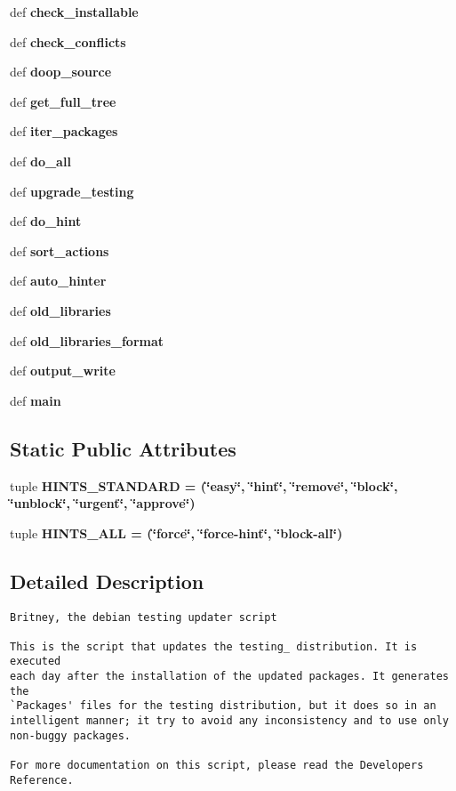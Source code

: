\begin{CompactItemize}
\item 
def \bf{check\_\-installable}
\item 
def \bf{check\_\-conflicts}
\item 
def \bf{doop\_\-source}
\item 
def \bf{get\_\-full\_\-tree}
\item 
def \bf{iter\_\-packages}
\item 
def \bf{do\_\-all}
\item 
def \bf{upgrade\_\-testing}
\item 
def \bf{do\_\-hint}
\item 
def \bf{sort\_\-actions}
\item 
def \bf{auto\_\-hinter}
\item 
def \bf{old\_\-libraries}
\item 
def \bf{old\_\-libraries\_\-format}
\item 
def \bf{output\_\-write}
\item 
def \bf{main}
\end{CompactItemize}
\subsection*{Static Public Attributes}
\begin{CompactItemize}
\item 
tuple \bf{HINTS\_\-STANDARD} = (\char`\"{}easy\char`\"{}, \char`\"{}hint\char`\"{}, \char`\"{}remove\char`\"{}, \char`\"{}block\char`\"{}, \char`\"{}unblock\char`\"{}, \char`\"{}urgent\char`\"{}, \char`\"{}approve\char`\"{})\label{classbritney_1_1Britney_ebbe3f40cca59e2de275b0558556ee63}

\item 
tuple \bf{HINTS\_\-ALL} = (\char`\"{}force\char`\"{}, \char`\"{}force-hint\char`\"{}, \char`\"{}block-all\char`\"{})\label{classbritney_1_1Britney_a088d6fd96963f87f88c9c40cda10bfa}

\end{CompactItemize}


\subsection{Detailed Description}


\footnotesize\begin{verbatim}Britney, the debian testing updater script

This is the script that updates the testing_ distribution. It is executed
each day after the installation of the updated packages. It generates the 
`Packages' files for the testing distribution, but it does so in an
intelligent manner; it try to avoid any inconsistency and to use only
non-buggy packages.

For more documentation on this script, please read the Developers Reference.
\end{verbatim}
\normalsize
 



